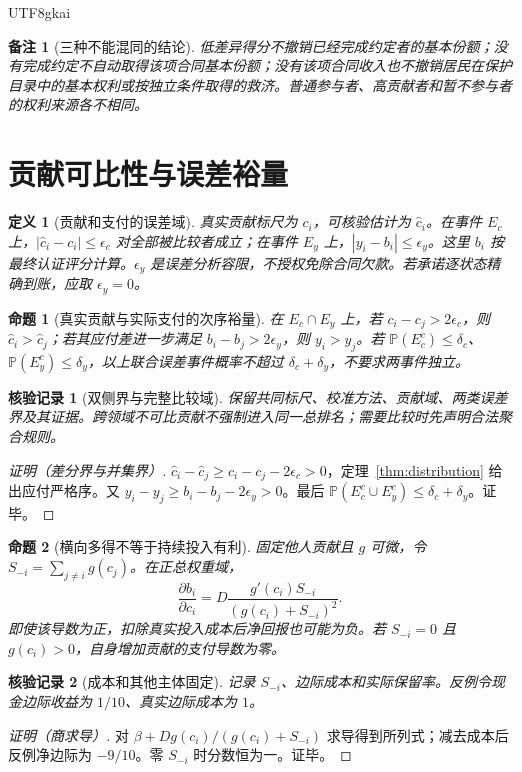 \documentclass[12pt,a4paper,openany]{report}
\newtheorem{definition}{定义}[chapter]
\newtheorem{proposition}{命题}[chapter]
\newtheorem{remark}{备注}[chapter]
\newtheorem{Certificate}{核验记录}[chapter]
\newcommand{\PP}{\mathbb P}
\begin{document}
\begin{CJK*}{UTF8}{gkai}
\begin{remark}[三种不能混同的结论]
低差异得分不撤销已经完成约定者的基本份额；没有完成约定不自动取得该项合同基本份额；没有该项合同收入也不撤销居民在保护目录中的基本权利或按独立条件取得的救济。普通参与者、高贡献者和暂不参与者的权利来源各不相同。
\end{remark}

\section{贡献可比性与误差裕量}
\begin{definition}[贡献和支付的误差域]
\label{def:errors}
真实贡献标尺为 $c_i$，可核验估计为 $\widehat c_i$。在事件 $E_c$ 上，$|\widehat c_i-c_i|\le\epsilon_c$ 对全部被比较者成立；在事件 $E_y$ 上，$|y_i-b_i|\le\epsilon_y$。这里 $b_i$ 按最终认证评分计算。$\epsilon_y$ 是误差分析容限，不授权免除合同欠款。若承诺逐状态精确到账，应取 $\epsilon_y=0$。
\end{definition}

\begin{proposition}[真实贡献与实际支付的次序裕量]
\label{prop:order-margin}
在 $E_c\cap E_y$ 上，若 $c_i-c_j>2\epsilon_c$，则 $\widehat c_i>\widehat c_j$；若其应付差进一步满足 $b_i-b_j>2\epsilon_y$，则 $y_i>y_j$。若 $\PP(E_c^c)\le\delta_c$、$\PP(E_y^c)\le\delta_y$，以上联合误差事件概率不超过 $\delta_c+\delta_y$，不要求两事件独立。
\end{proposition}
\begin{Certificate}[双侧界与完整比较域]
保留共同标尺、校准方法、贡献域、两类误差界及其证据。跨领域不可比贡献不强制进入同一总排名；需要比较时先声明合法聚合规则。
\end{Certificate}
\begin{proof}[证明（差分界与并集界）]
$\widehat c_i-\widehat c_j\ge c_i-c_j-2\epsilon_c>0$，定理~\ref{thm:distribution} 给出应付严格序。又 $y_i-y_j\ge b_i-b_j-2\epsilon_y>0$。最后 $\PP(E_c^c\cup E_y^c)\le\delta_c+\delta_y$。证毕。
\end{proof}

\begin{proposition}[横向多得不等于持续投入有利]
\label{prop:ordinal-not-effort}
固定他人贡献且 $g$ 可微，令 $S_{-i}=\sum_{j\ne i}g(c_j)$。在正总权重域，
\[
 \frac{\partial b_i}{\partial c_i}
 =D\frac{g'(c_i)S_{-i}}{(g(c_i)+S_{-i})^2}.
\]
即使该导数为正，扣除真实投入成本后净回报也可能为负。若 $S_{-i}=0$ 且 $g(c_i)>0$，自身增加贡献的支付导数为零。
\end{proposition}
\begin{Certificate}[成本和其他主体固定]
记录 $S_{-i}$、边际成本和实际保留率。反例令现金边际收益为 $1/10$、真实边际成本为 $1$。
\end{Certificate}
\begin{proof}[证明（商求导）]
对 $\beta+Dg(c_i)/(g(c_i)+S_{-i})$ 求导得到所列式；减去成本后反例净边际为 $-9/10$。零 $S_{-i}$ 时分数恒为一。证毕。
\end{proof}


\end{CJK*}
\end{document}
